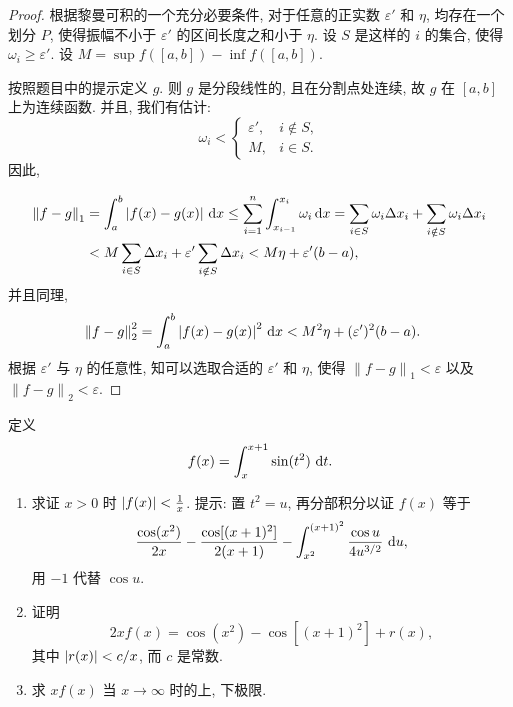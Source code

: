 \documentclass{article}
\begin{document}
\begin{proof}
  根据黎曼可积的一个充分必要条件, 对于任意的正实数 \( \varepsilon' \) 和 \( \eta \), 均存在一个划分 \( P \), 使得振幅不小于 \( \varepsilon' \) 的区间长度之和小于 \( \eta \). 设 \( S \) 是这样的 \( i \) 的集合, 使得 \( \omega_i\ge \varepsilon' \). 设 \( M=\sup f([a,b])-\inf f([a,b]) \). 

  按照题目中的提示定义 \( g \). 则 \( g \) 是分段线性的, 且在分割点处连续, 故 \( g \) 在 \( [a,b] \) 上为连续函数. 并且, 我们有估计:
  \[ \omega_i<\begin{cases}
    \varepsilon', & i\notin S, \\
    M, & i\in S.
  \end{cases} \]
  因此, 

  \begin{align*}
    \left\|f-g\right\|_1
    &=\int_a^b \left|f(x)-g(x)\right|\,\mathrm{d} x
    \le \sum_{i=1}^{n}\int_{x_{i-1}}^{x_i}\omega_i\,\mathrm{d} x
    =\sum_{i\in S}\omega_i\Delta x_i + \sum_{i\notin S}\omega_i\Delta x_i\\
    &<M\sum_{i\in S}\Delta x_i + \varepsilon'\sum_{i\notin S}\Delta x_i
    <M\eta + \varepsilon'(b-a),
  \end{align*}
  并且同理, 
  \begin{align*}
    \left\|f-g\right\|_2^2
    &=\int_a^b \left|f(x)-g(x)\right|^2\,\mathrm{d} x
    <M^2\eta + (\varepsilon')^2(b-a).
  \end{align*}
  根据 \( \varepsilon' \) 与 \( \eta \) 的任意性, 知可以选取合适的 \( \varepsilon' \) 和 \( \eta \), 使得 \( \left\|f-g\right\|_1 < \varepsilon \) 以及 \( \left\|f-g\right\|_2 < \varepsilon \).
\end{proof}



\begin{problem}
定义
\[
f(x) = \int_x^{x+1} \sin(t^2)\,\,\mathrm{d} t.
\]
\begin{enumerate}[label=(\alph*)]
  \item 求证 $x > 0$ 时 $\left|f(x)\right| < \frac{1}{x}$.
  提示: 置 $t^2 = u$, 再分部积分以证 $f(x)$ 等于
  \[
  \frac{\cos(x^2)}{2x} - \frac{\cos[(x+1)^2]}{2(x+1)} - \int_{x^2}^{(x+1)^2} \frac{\cos u}{4u^{3/2}}\,\,\mathrm{d} u,
  \]
  用 $-1$ 代替 $\cos u$.
  \item 证明
  \[
  2x f(x) = \cos(x^2) - \cos[(x+1)^2] + r(x),
  \]
  其中 $\left|r(x)\right| < c/x$, 而 $c$ 是常数.
  \item 求 $x f(x)$ 当 $x \to \infty$ 时的上, 下极限.
\end{enumerate}
\end{problem}
\end{document}
